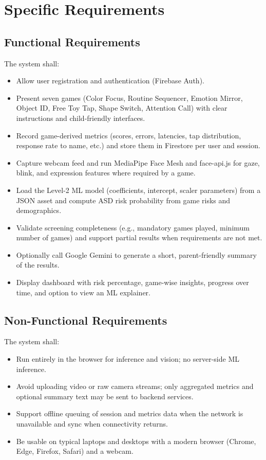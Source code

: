 \documentclass[12pt,a4paper]{report}
\begin{document}
\section{Specific Requirements}
\subsection{Functional Requirements}
The system shall:
\begin{itemize}
    \item Allow user registration and authentication (Firebase Auth).
    \item Present seven games (Color Focus, Routine Sequencer, Emotion Mirror, Object ID, Free Toy Tap, Shape Switch, Attention Call) with clear instructions and child-friendly interfaces.
    \item Record game-derived metrics (scores, errors, latencies, tap distribution, response rate to name, etc.) and store them in Firestore per user and session.
    \item Capture webcam feed and run MediaPipe Face Mesh and face-api.js for gaze, blink, and expression features where required by a game.
    \item Load the Level-2 ML model (coefficients, intercept, scaler parameters) from a JSON asset and compute ASD risk probability from game risks and demographics.
    \item Validate screening completeness (e.g., mandatory games played, minimum number of games) and support partial results when requirements are not met.
    \item Optionally call Google Gemini to generate a short, parent-friendly summary of the results.
    \item Display dashboard with risk percentage, game-wise insights, progress over time, and option to view an ML explainer.
\end{itemize}
\subsection{Non-Functional Requirements}
The system shall:
\begin{itemize}
    \item Run entirely in the browser for inference and vision; no server-side ML inference.
    \item Avoid uploading video or raw camera streams; only aggregated metrics and optional summary text may be sent to backend services.
    \item Support offline queuing of session and metrics data when the network is unavailable and sync when connectivity returns.
    \item Be usable on typical laptops and desktops with a modern browser (Chrome, Edge, Firefox, Safari) and a webcam.
\end{itemize}
\end{document}
